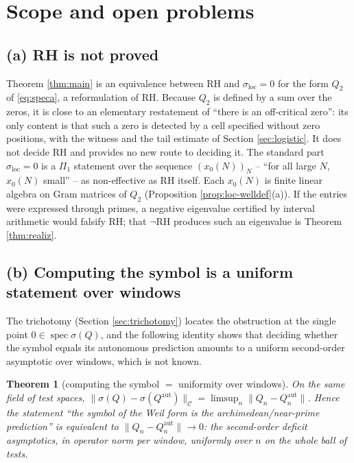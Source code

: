 \documentclass[11pt,reqno]{amsart}
\newtheorem{theorem}{Theorem}[section]
\theoremstyle{definition}
\newcommand{\Cor}{\mathcal{C}}
\newcommand{\spec}{\operatorname{spec}}
\newcommand{\Qaut}{Q^{\mathrm{aut}}}
\begin{document}
\section{Scope and open problems}\label{sec:honest}

\subsection{(a) RH is not proved}
Theorem \ref{thm:main} is an equivalence between RH and
\(\sigma_{\mathrm{loc}}=0\) for the form \(Q_2\) of \eqref{eq:speca}, a
reformulation of RH. Because \(Q_2\) is defined by a sum over the zeros, it is
close to an elementary restatement of ``there is an off-critical zero'': its
only content is that such a zero is detected by a cell specified without zero
positions, with the witness and the tail estimate of Section
\ref{sec:logistic}. It does not decide RH and provides no new route to
deciding it. The standard part
\(\sigma_{\mathrm{loc}}=0\) is a \(\Pi_1\) statement over the sequence
\((x_0(N))_N\) -- ``for all large \(N\), \(x_0(N)\) small'' -- as non-effective
as RH itself. Each \(x_0(N)\) is finite linear algebra on Gram matrices of
\(Q_2\) (Proposition \ref{prop:loc-welldef}(a)). If the entries were expressed
through primes, a negative eigenvalue certified by interval arithmetic would
falsify RH; that \(\neg\)RH produces such an eigenvalue is Theorem
\ref{thm:realiz}.

\subsection{(b) Computing the symbol is a uniform statement over windows}
The trichotomy (Section \ref{sec:trichotomy}) locates the obstruction at the
single point \(0\in\spec\sigma(Q)\), and the following identity shows that
deciding whether the symbol equals its autonomous prediction amounts to a
uniform second-order asymptotic over windows, which is not known.

\begin{theorem}[computing the symbol \(=\) uniformity over windows]
\label{thm:symbolcompute}
On the same field of test spaces,
\(\|\sigma(Q)-\sigma(\Qaut)\|_{\Cor}=\limsup_n\|Q_n-\Qaut_n\|\). Hence the
statement ``the symbol of the Weil form is the archimedean/near-prime
prediction'' is equivalent to \(\|Q_n-\Qaut_n\|\to0\): the second-order
deficit asymptotics, in operator norm per window, \emph{uniformly} over \(n\) on
the whole ball of tests.
\end{theorem}
\end{document}
